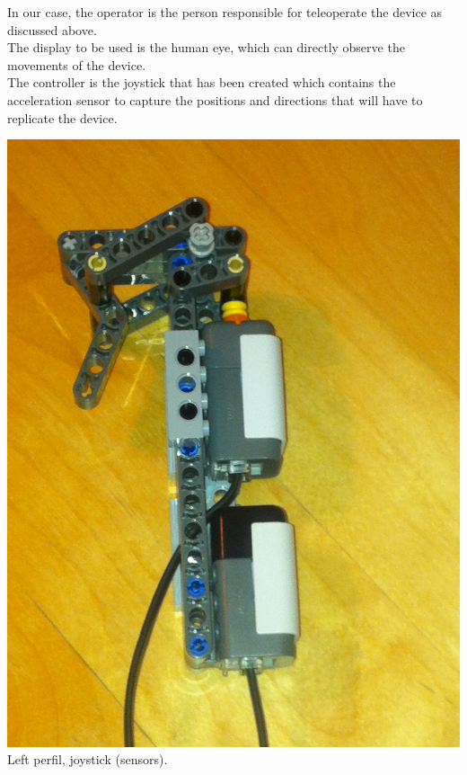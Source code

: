 \documentclass[a4paper,11pt]{article}
\begin{document}
\begin{multicols}{2}
			In our case, the operator is the person responsible for teleoperate the device as discussed above.\\

			The display to be used is the human eye, which can directly observe the movements of the device.\\

			The controller is the joystick that has been created which contains the acceleration sensor to capture the positions and directions that will have to replicate the device.\\

			\begin{center}
				\includegraphics[scale=0.1]{img/joystick_left.png}\\
				Left perfil, joystick (sensors).
			\end{center}


\end{multicols}
\end{document}
